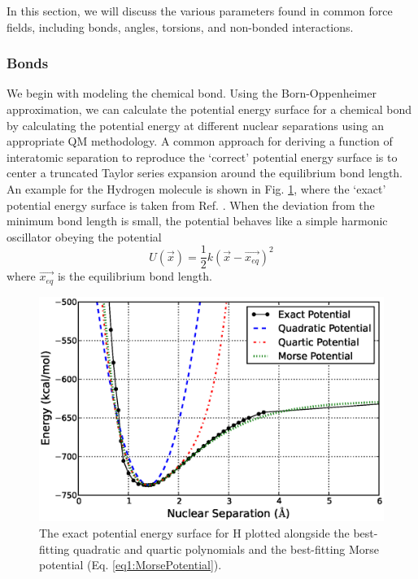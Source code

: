 In this section, we will discuss the various parameters found in common force
fields, including bonds, angles, torsions, and non-bonded interactions.

\subsubsection{Bonds}

We begin with modeling the chemical bond. Using the Born-Oppenheimer
approximation, we can calculate the potential energy surface for a chemical bond
by calculating the potential energy at different nuclear separations using an
appropriate QM methodology. A common approach for deriving a function of
interatomic separation to reproduce the `correct' potential energy surface is to
center a truncated Taylor series expansion around the equilibrium bond length.
An example for the Hydrogen molecule is shown in Fig.
\ref{fig1:HydrogenMoleculeBond}, where the `exact' potential energy surface is
taken from Ref. . When the deviation from the minimum bond
length is small, the potential behaves like a simple harmonic oscillator obeying
the potential 
\begin{equation}
   U(\vec{x}) = \frac 1 2 k (\vec{x} - \vec{x_{eq}}) ^ 2
   \label{eq1:HarmonicOscillator}
\end{equation}
where $\vec{x_{eq}}$ is the equilibrium bond length.

\begin{figure}
   \includegraphics[width=6.5in]{HydrogenMoleculeBond.ps}
   \caption{The exact potential energy surface for H \cite{Kolos1964}
            plotted alongside the best-fitting quadratic and quartic polynomials
            and the best-fitting Morse potential (Eq.
            \ref{eq1:MorsePotential}).}
   \label{fig1:HydrogenMoleculeBond}
\end{figure}

